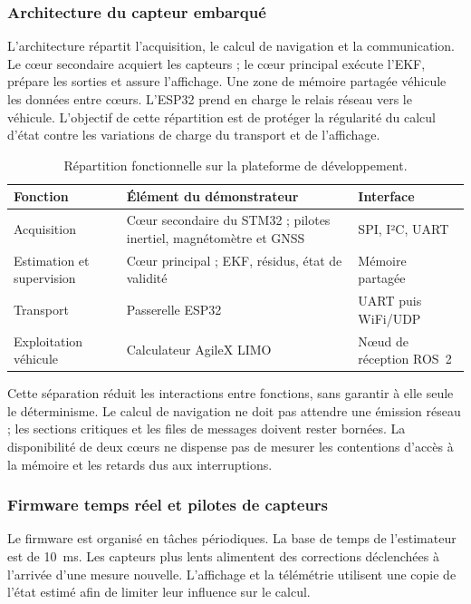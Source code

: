 \documentclass[11pt,a4paper]{article}
\begin{document}
\subsubsection{Architecture du capteur embarqué}

L'architecture répartit l'acquisition, le calcul de navigation et la communication. Le cœur secondaire acquiert les capteurs ; le cœur principal exécute l'EKF, prépare les sorties et assure l'affichage. Une zone de mémoire partagée véhicule les données entre cœurs. L'ESP32 prend en charge le relais réseau vers le véhicule. L'objectif de cette répartition est de protéger la régularité du calcul d'état contre les variations de charge du transport et de l'affichage.

\begin{table}[!htbp]\centering\small
\begin{tabularx}{\linewidth}{|L{3.5cm}|Y|L{3.5cm}|}\hline
{}\textbf{Fonction} & \textbf{Élément du démonstrateur} & \textbf{Interface}\\\hline
Acquisition & Cœur secondaire du STM32 ; pilotes inertiel, magnétomètre et GNSS & SPI, I²C, UART\\\hline
Estimation et supervision & Cœur principal ; EKF, résidus, état de validité & Mémoire partagée\\\hline
Transport & Passerelle ESP32 & UART puis WiFi/UDP\\\hline
Exploitation véhicule & Calculateur AgileX LIMO & Nœud de réception ROS~2\\\hline
\end{tabularx}
\caption{Répartition fonctionnelle sur la plateforme de développement.}
\end{table}

Cette séparation réduit les interactions entre fonctions, sans garantir à elle seule le déterminisme. Le calcul de navigation ne doit pas attendre une émission réseau ; les sections critiques et les files de messages doivent rester bornées. La disponibilité de deux cœurs ne dispense pas de mesurer les contentions d'accès à la mémoire et les retards dus aux interruptions.

\subsubsection{Firmware temps réel et pilotes de capteurs}

Le firmware est organisé en tâches périodiques. La base de temps de l'estimateur est de 10~ms. Les capteurs plus lents alimentent des corrections déclenchées à l'arrivée d'une mesure nouvelle. L'affichage et la télémétrie utilisent une copie de l'état estimé afin de limiter leur influence sur le calcul.
\end{document}
